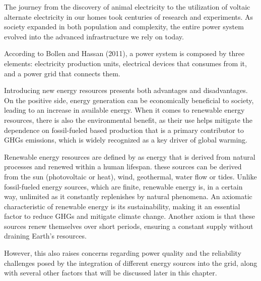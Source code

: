 \cleardoublepage
\label{chap:2background}

The journey from the discovery of animal electricity to the utilization of voltaic alternate electricity in our homes took centuries of research and experiments. As society expanded in both population and complexity, the entire power system evolved into the advanced infrastructure we rely on today\cite{rahman_basicsElectricity_2016}.

According to Bollen and Hassan (2011)\cite{integrationdg_bollen2011}, a power system is composed by three elements: electricity production units, electrical devices that consumes from it, and a power grid that connects them.

Introducing new energy resources presents both advantages and disadvantages. On the positive side, energy generation can be economically beneficial to society, leading to an increase in available energy. When it comes to renewable energy resources, there is also the environmental benefit, as their use helps mitigate the dependence on fossil-fueled based production that is a primary contributor to \acp{GHG} emissions, which is widely recognized as a key driver of global warming.

Renewable energy resources are defined by \cite{renewableenergies_rybar2015} as energy that is derived from natural processes and renewed within a human lifespan. these sources can be derived from the sun (photovoltaic or heat), wind, geothermal, water flow or tides. Unlike fossil-fueled energy sources, which are finite, renewable energy is, in a certain way, unlimited as it constantly replenishes by natural phenomena. An axiomatic characteristic of renewable energy is its sustainability, making it an essential factor to reduce \acp{GHG} and mitigate climate change. Another axiom is that these sources renew themselves over short periods, ensuring a constant supply without draining Earth's resources.

However, this also raises concerns regarding power quality and the reliability challenges posed by the integration of different energy sources into the grid, along with several other factors that will be discussed  later in this chapter.

